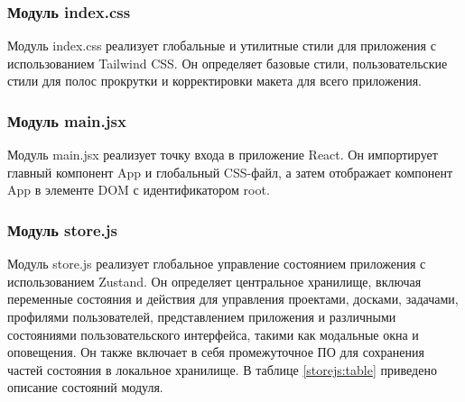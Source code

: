 \subsubsection{Модуль index.css}
Модуль index.css реализует глобальные и утилитные стили для приложения с использованием Tailwind CSS. Он определяет базовые стили, пользовательские стили для полос прокрутки и корректировки макета для всего приложения.

\subsubsection{Модуль main.jsx}
Модуль main.jsx реализует точку входа в приложение React. Он импортирует главный компонент App и глобальный CSS-файл, а затем отображает компонент App в элементе DOM с идентификатором root.

\subsubsection{Модуль store.js}
Модуль store.js реализует глобальное управление состоянием приложения с использованием Zustand. Он определяет центральное хранилище, включая переменные состояния и действия для управления проектами, досками, задачами, профилями пользователей, представлением приложения и различными состояниями пользовательского интерфейса, такими как модальные окна и оповещения. Он также включает в себя промежуточное ПО для сохранения частей состояния в локальное хранилище. В таблице \ref{storejs:table} приведено описание состояний модуля.

